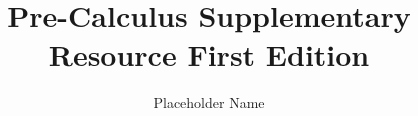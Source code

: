 \usepackage{graphicx} %
\usepackage{amsmath, amssymb, amsthm} %
\usepackage{hyperref} %
\usepackage{needspace} %
\usepackage{gensymb} %

\usepackage{caption}
\usepackage{wrapfig}

\usepackage{fvextra} %




\usepackage{parskip} %
\setlength{\parskip}{1em} %

\usepackage{titlesec}
\titlespacing{\section}{0pt}{3pt}{3pt}
\titlespacing{\subsection}{0pt}{3pt}{3pt}
\raggedbottom

\usepackage{setspace}
\onehalfspacing

\usepackage{xcolor} %
\usepackage{pgfplots} %
\pgfplotsset{compat=1.18} %

\usepackage{tcolorbox}



\newenvironment{solution}[1][]{%
    \par\medskip
    \Needspace{3\baselineskip}%
    \noindent\hrule\medskip
    \noindent\textbf{Solution. }%
    \ignorespaces
}{%
    \par\medskip
    \noindent\hrule\medskip
}



\title{Pre-Calculus Supplementary Resource First Edition}
\author{Placeholder Name}
